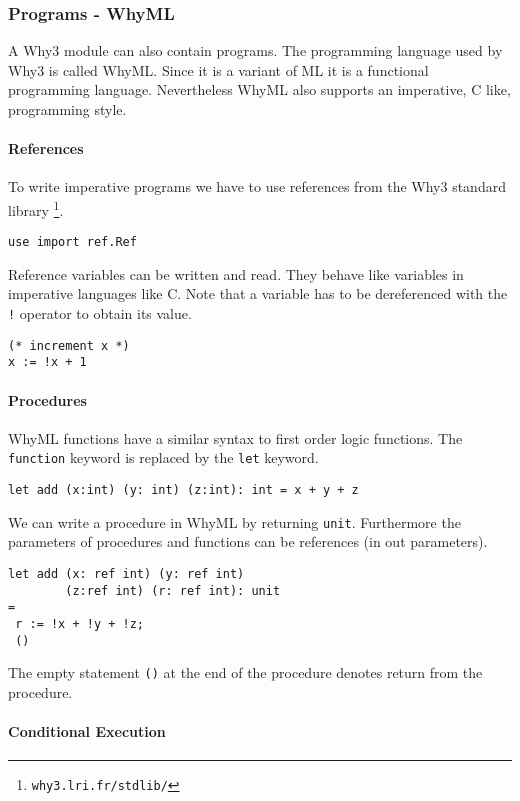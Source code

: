 \subsubsection{Programs - WhyML}

A Why3 module can also contain programs. The programming language used
by Why3 is called WhyML. Since it is a variant of ML it is a functional
programming language. Nevertheless WhyML also supports an imperative,
C like, programming style.

\paragraph{References} \label{ref}

To write imperative programs we have to use 
references from the Why3 standard library \footnote{\verb"why3.lri.fr/stdlib/"}.
\begin{lstlisting}
use import ref.Ref
\end{lstlisting}
Reference variables can be written and read. They behave like variables in
imperative languages like C. Note that a variable has to be dereferenced
with the \verb"!" operator to obtain its value.
\begin{lstlisting}
(* increment x *)
x := !x + 1
\end{lstlisting}

\paragraph{Procedures} \label{function}

WhyML functions have a similar syntax to first order logic functions. The 
\verb"function" keyword is replaced by the \verb"let" keyword.
\begin{lstlisting}
let add (x:int) (y: int) (z:int): int = x + y + z
\end{lstlisting}
We can write a procedure in WhyML by returning \verb"unit". Furthermore the parameters
of procedures and functions can be references (in out parameters).
\begin{lstlisting}
let add (x: ref int) (y: ref int) 
        (z:ref int) (r: ref int): unit
=
 r := !x + !y + !z;
 ()
\end{lstlisting}
The empty statement \verb"()" at the end of the procedure denotes return from the procedure.

\paragraph{Conditional Execution}

